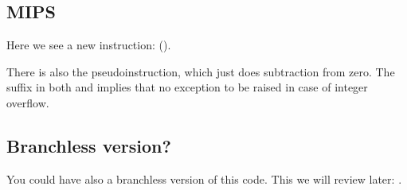 

\subsection{MIPS}



Here we see a new instruction:  ().

There is also the  pseudoinstruction, which just does subtraction from zero.
The  suffix in both  and  implies that no exception to be raised in case of integer overflow.

\subsection{Branchless version?}

You could have also a branchless version of this code. This we will review later: .
